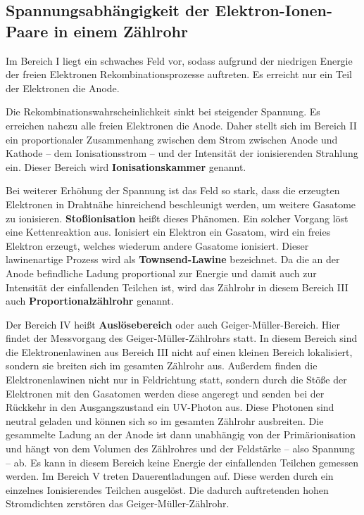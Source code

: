 \subsection{Spannungsabhängigkeit der Elektron-Ionen-Paare in einem Zählrohr}
Im Bereich I liegt ein schwaches Feld vor, sodass aufgrund der niedrigen Energie der
freien Elektronen Rekombinationsprozesse auftreten. Es erreicht nur ein Teil der Elektronen
die Anode.

Die Rekombinationswahrscheinlichkeit sinkt bei steigender Spannung. Es erreichen nahezu alle
freien Elektronen die Anode.
Daher stellt sich im Bereich II ein proportionaler Zusammenhang zwischen dem Strom zwischen
Anode und Kathode -- dem Ionisationsstrom -- und der Intensität der ionisierenden Strahlung ein.
Dieser Bereich wird \textbf{Ionisationskammer} genannt.

Bei weiterer Erhöhung der Spannung ist das Feld so stark, dass die erzeugten Elektronen
in Drahtnähe hinreichend beschleunigt werden, um weitere Gasatome zu ionisieren.
\textbf{Stoßionisation} heißt dieses Phänomen.
Ein solcher Vorgang löst eine Kettenreaktion aus. Ionisiert ein Elektron ein Gasatom,
wird ein freies Elektron erzeugt, welches wiederum andere Gasatome ionisiert.
Dieser lawinenartige Prozess wird als \textbf{Townsend-Lawine} bezeichnet.
Da die an der Anode befindliche Ladung proportional zur Energie und damit auch zur Intensität
der einfallenden Teilchen ist, wird das Zählrohr in diesem Bereich III auch
\textbf{Proportionalzählrohr} genannt.

Der Bereich IV heißt \textbf{Auslösebereich} oder auch Geiger-Müller-Bereich. Hier findet
der Messvorgang des Geiger-Müller-Zählrohrs statt.
In diesem Bereich sind die Elektronenlawinen aus Bereich III nicht auf einen kleinen Bereich
lokalisiert, sondern sie breiten sich im gesamten Zählrohr aus. Außerdem finden die
Elektronenlawinen nicht nur in Feldrichtung statt, sondern durch die Stöße der Elektronen mit
den Gasatomen werden diese angeregt und senden bei der Rückkehr in den Ausgangszustand
ein UV-Photon aus. Diese Photonen sind neutral geladen und können sich so im gesamten
Zählrohr ausbreiten.
Die gesammelte Ladung an der Anode ist dann unabhängig von der Primärionisation und hängt
von dem Volumen des Zählrohres und der Feldstärke -- also Spannung -- ab.
Es kann in diesem Bereich keine Energie der einfallenden Teilchen gemessen werden.
Im Bereich V treten Dauerentladungen auf. Diese werden durch ein einzelnes Ionisierendes Teilchen
ausgelöst. Die dadurch auftretenden hohen Stromdichten zerstören das Geiger-Müller-Zählrohr.
\FloatBarrier
